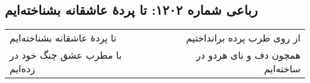 \begin{center}
\section*{رباعی شماره ۱۲۰۲: تا پردهٔ عاشقانه بشناخته‌ایم}
\label{sec:1202}
\begin{longtable}{l p{0.5cm} r}
تا پردهٔ عاشقانه بشناخته‌ایم
&&
از روی طرب پرده برانداختیم
\\
با مطرب عشق چنگ خود در زده‌ایم
&&
همچون دف و نای هردو در ساخته‌ایم
\\
\end{longtable}
\end{center}
